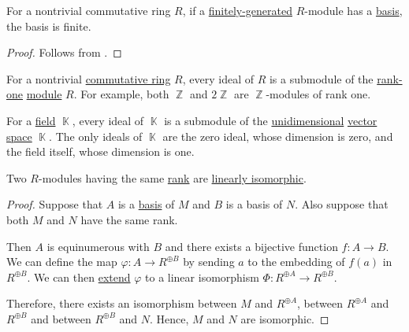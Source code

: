 \begin{corollary}\label{thm:finitely_generated_module_basis}
  For a nontrivial commutative ring \( R \), if a \hyperref[def:module_presentation]{finitely-generated} \( R \)-module has a \hyperref[def:hamel_basis]{basis}, the basis is finite.
\end{corollary}
\begin{proof}
  Follows from .
\end{proof}

\begin{example}\label{ex:field_submodules}
  For a nontrivial \hyperref[def:ring/commutative]{commutative ring} \( R \), every ideal of \( R \) is a submodule of the \hyperref[thm:commutative_module_rank]{rank-one} \hyperref[def:module]{module} \( R \). For example, both \( \BbbZ \) and \( 2\BbbZ \) are \( \BbbZ \)-modules of rank one.

  For a \hyperref[def:field]{field} \( \BbbK \), every ideal of \( \BbbK \) is a submodule of the \hyperref[thm:vector_space_dimension]{unidimensional} \hyperref[def:vector_space]{vector space} \( \BbbK \). The only ideals of \( \BbbK \) are the zero ideal, whose dimension is zero, and the field itself, whose dimension is one.
\end{example}

\begin{proposition}\label{thm:modules_with_same_rank_are_isomorphic}
  Two \( R \)-modules having the same \hyperref[thm:commutative_module_rank]{rank} are \hyperref[def:semimodule/homomorphism]{linearly isomorphic}.
\end{proposition}
\begin{proof}
  Suppose that \( A \) is a \hyperref[def:hamel_basis]{basis} of \( M \) and \( B \) is a basis of \( N \). Also suppose that both \( M \) and \( N \) have the same rank.

  Then \( A \) is equinumerous with \( B \) and there exists a bijective function \( f: A \to B \). We can define the map \( \varphi: A \to R^{\oplus B} \) by sending \( a \) to the embedding of \( f(a) \) in \( R^{\oplus B} \). We can then \hyperref[thm:free_semimodule_universal_property]{extend} \( \varphi \) to a linear isomorphism \( \Phi: R^{\oplus A} \to R^{\oplus B} \).

  Therefore, there exists an isomorphism between \( M \) and \( R^{\oplus A} \), between \( R^{\oplus A} \) and \( R^{\oplus B} \) and between \( R^{\oplus B} \) and \( N \). Hence, \( M \) and \( N \) are isomorphic.
\end{proof}

